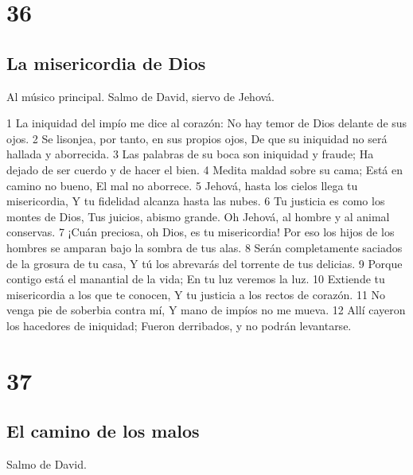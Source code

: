 \chapter{36}

\section*{La misericordia de Dios}

Al músico principal. Salmo de David, siervo de Jehová.

1 La iniquidad del impío me dice al corazón:
No hay temor de Dios delante de sus ojos.
2 Se lisonjea, por tanto, en sus propios ojos,
De que su iniquidad no será hallada y aborrecida.
3 Las palabras de su boca son iniquidad y fraude;
Ha dejado de ser cuerdo y de hacer el bien.
4 Medita maldad sobre su cama;
Está en camino no bueno,
El mal no aborrece.
5 Jehová, hasta los cielos llega tu misericordia,
Y tu fidelidad alcanza hasta las nubes.
6 Tu justicia es como los montes de Dios,
Tus juicios, abismo grande.
Oh Jehová, al hombre y al animal conservas.
7 ¡Cuán preciosa, oh Dios, es tu misericordia!
Por eso los hijos de los hombres se amparan bajo la sombra de tus alas.
8 Serán completamente saciados de la grosura de tu casa,
Y tú los abrevarás del torrente de tus delicias.
9 Porque contigo está el manantial de la vida;
En tu luz veremos la luz.
10 Extiende tu misericordia a los que te conocen,
Y tu justicia a los rectos de corazón.
11 No venga pie de soberbia contra mí,
Y mano de impíos no me mueva.
12 Allí cayeron los hacedores de iniquidad;
Fueron derribados, y no podrán levantarse.

\chapter{37}

\section*{El camino de los malos}

Salmo de David.

